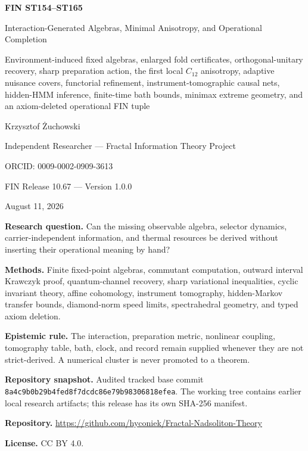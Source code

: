 \documentclass[11pt,a4paper]{article}
\begin{document}
\begin{titlepage}
\centering
\vspace*{0.85cm}
{\LARGE\bfseries FIN ST154--ST165\par}
\vspace{0.28cm}
{\Large Interaction-Generated Algebras, Minimal Anisotropy, and Operational Completion\par}
\vspace{0.40cm}
{\large Environment-induced fixed algebras, enlarged fold certificates, orthogonal-unitary recovery, sharp preparation action, the first local $C_{12}$ anisotropy, adaptive nuisance covers, functorial refinement, instrument-tomographic causal nets, hidden-HMM inference, finite-time bath bounds, minimax extreme geometry, and an axiom-deleted operational FIN tuple\par}
\vspace{0.75cm}
{\Large Krzysztof \.{Z}uchowski\par}
\vspace{0.18cm}
{\large Independent Researcher --- Fractal Information Theory Project\par}
{\large ORCID: 0009-0002-0909-3613\par}
\vspace{0.55cm}
{\large FIN Release 10.67 --- Version 1.0.0\par}
{\large August 11, 2026\par}
\vfill
\begin{minipage}{0.92\textwidth}
\textbf{Research question.} Can the missing observable algebra, selector dynamics, carrier-independent information, and thermal resources be derived without inserting their operational meaning by hand?\par
\textbf{Methods.} Finite fixed-point algebras, commutant computation, outward interval Krawczyk proof, quantum-channel recovery, sharp variational inequalities, cyclic invariant theory, affine cohomology, instrument tomography, hidden-Markov transfer bounds, diamond-norm speed limits, spectrahedral geometry, and typed axiom deletion.\par
\textbf{Epistemic rule.} The interaction, preparation metric, nonlinear coupling, tomography table, bath, clock, and record remain supplied whenever they are not strict-derived. A numerical cluster is never promoted to a theorem.\par
\textbf{Repository snapshot.} Audited tracked base commit \texttt{8a4c9b0b29b4fed8f7dcdc86e79b98306818efea}. The working tree contains earlier local research artifacts; this release has its own SHA-256 manifest.\par
\textbf{Repository.} \url{https://github.com/hyconiek/Fractal-Nadsoliton-Theory}\par
\textbf{License.} CC BY 4.0.
\end{minipage}
\end{titlepage}
\end{document}
